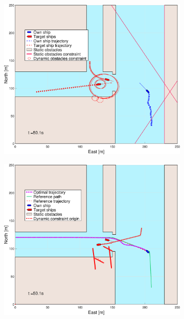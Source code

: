 \begin{figure}[!ht]
\begin{subfigure}[b]{0.494\textwidth}
        \subcaption{}
    \end{subfigure}
    \hfill
    \\
    \begin{subfigure}[b]{0.494\textwidth}
        \centering
        \includegraphics[width=\textwidth]{Images/Figures/Havn1/_Simple_0fig1_time=50}
        \subcaption{}
    \end{subfigure}
    \hfill
    \begin{subfigure}[b]{0.494\textwidth}
        \centering
        \includegraphics[width=\textwidth]{Images/Figures/Havn1/_Simple_0fig999_time=50}
        \subcaption{}
    \end{subfigure}
    \hfill
    \label{FIG: Canals With Pred}
\end{figure}%

